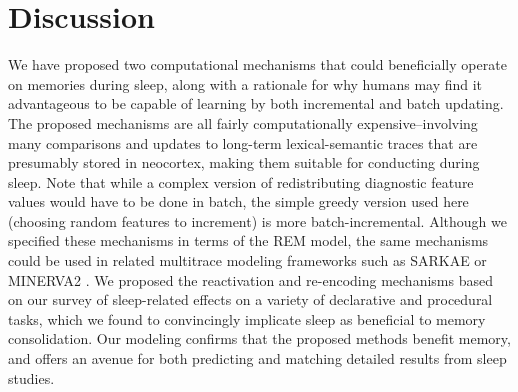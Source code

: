 \documentclass[10pt,letterpaper]{article}
\begin{document}
\section{Discussion}
\vspace{-.1cm}
We have proposed two computational mechanisms that could beneficially operate on memories during sleep, along with a rationale for why humans may find it advantageous to be capable of learning by both incremental and batch updating. The proposed mechanisms are all fairly computationally expensive--involving many comparisons and updates to long-term lexical-semantic traces that are presumably stored in neocortex, making them suitable for conducting during sleep. Note that while a complex version of redistributing diagnostic feature values would have to be done in batch, the simple greedy version used here (choosing random features to increment) is more batch-incremental. Although we specified these mechanisms in terms of the REM \cite{Shiffrin:1997} model, the same mechanisms could be used in related multitrace modeling frameworks such as SARKAE \cite{Nelson:2013} or MINERVA2 \cite{Hintzman:1984}. We proposed the reactivation and re-encoding mechanisms based on our survey of sleep-related effects on a variety of declarative and procedural tasks, which we found to convincingly implicate sleep as beneficial to memory consolidation. Our modeling confirms that the proposed methods benefit memory, and offers an avenue for both predicting and matching detailed results from sleep studies. 





\vspace{-.2cm}
\end{document}

